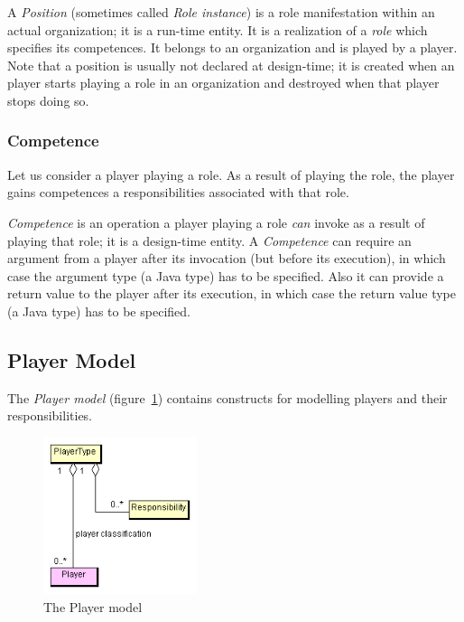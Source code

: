 A \textit{Position} (sometimes called \textit{Role instance}) is a role manifestation within an actual organization; it is a run-time entity.
It is a realization of a \textit{role} which specifies its competences.
It belongs to an organization and is played by a player.
Note that a position is usually not declared at design-time; it is created when an player starts playing a role in an organization and destroyed when that player stops doing so.

\subsubsection*{Competence}

Let us consider a player playing a role.
As a result of playing the role, the player gains competences a responsibilities associated with that role.

\textit{Competence} is an operation a player playing a role \textit{can} invoke as a result of playing that role; it is a design-time entity.
A \textit{Competence} can require an argument from a player after its invocation (but before its execution), in which case the argument type (a Java type) has to be specified.
Also it can provide a return value to the player after its execution, in which case the return value type (a Java type) has to be specified.

\subsection{Player Model}

The \textit{Player model} (figure~\ref{figure:thespian-player-model}) contains constructs for modelling players and their responsibilities.

\begin{figure}[ht]
	\centering
	\includegraphics[width=0.4\textwidth]{images/thespian/player-model.png}
	\caption{The Player model}
	\label{figure:thespian-player-model}
\end{figure}

